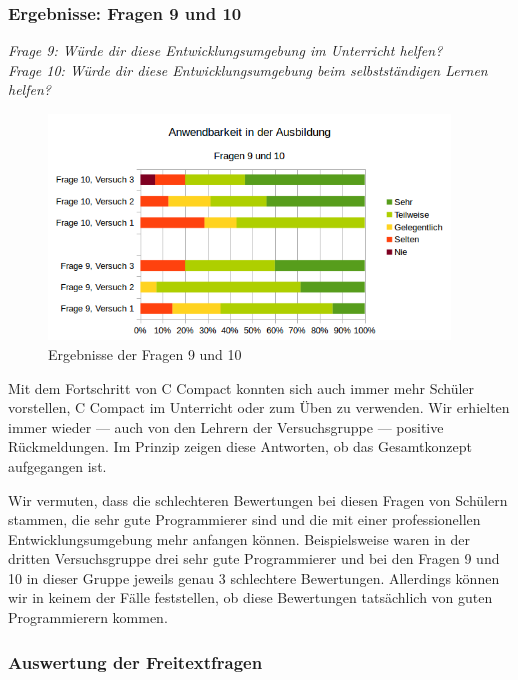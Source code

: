 \subsubsection*{Ergebnisse: Fragen 9 und 10}

\emph{Frage 9: Würde dir diese Entwicklungsumgebung im Unterricht helfen?\\
Frage 10: Würde dir diese Entwicklungsumgebung beim selbstständigen Lernen helfen?}

\begin{figure}[h!]
\centering
\includegraphics[width=0.95\textwidth]{./media/images/gui/trials/gui-f9-10.png}
\caption{Ergebnisse der Fragen 9 und 10}
\end{figure}

Mit dem Fortschritt von C Compact konnten sich auch immer mehr Schüler vorstellen, C Compact im Unterricht oder zum Üben zu verwenden. Wir erhielten immer wieder --- auch von den Lehrern der Versuchsgruppe --- positive Rückmeldungen. Im Prinzip zeigen diese Antworten, ob das Gesamtkonzept aufgegangen ist.

Wir vermuten, dass die schlechteren Bewertungen bei diesen Fragen von Schülern stammen, die sehr gute Programmierer sind und die mit einer professionellen Entwicklungsumgebung mehr anfangen können. Beispielsweise waren in der dritten Versuchsgruppe drei sehr gute Programmierer und bei den Fragen 9 und 10 in dieser Gruppe jeweils genau 3 schlechtere Bewertungen. Allerdings können wir in keinem der Fälle feststellen, ob diese Bewertungen tatsächlich von guten Programmierern kommen.

\subsubsection*{Auswertung der Freitextfragen}

